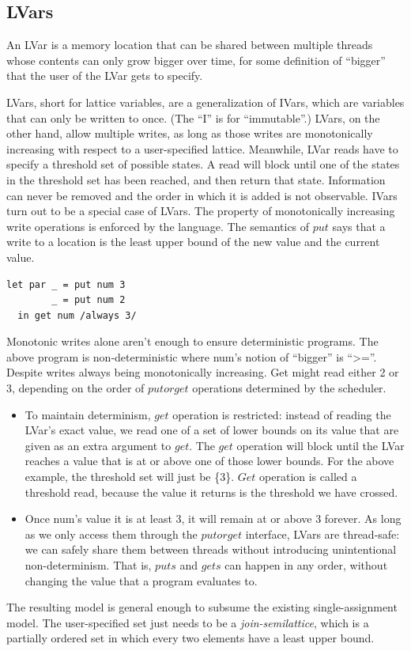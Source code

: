 \documentclass[twocolumn]{article}
\begin{document}
\subsection{LVars}
An LVar is a memory location that can be shared between multiple threads whose contents can only grow bigger over time, for some definition of “bigger” that the user of the LVar gets to specify. \par
LVars, short for lattice variables, are a generalization of IVars, which are variables that can only be written to once. (The “I” is for “immutable”.) LVars, on the other hand, allow multiple writes, as long as those writes are monotonically increasing with respect to a user-specified lattice. Meanwhile, LVar reads have to specify a threshold set of possible states. A read will block until one of the states in the threshold set has been reached, and then return that state. Information can never be removed and the order in which it is added is not observable. IVars turn out to be a special case of LVars. 
The property of monotonically increasing write operations is enforced by the language. The semantics of $put$ says that a write to a location is the least upper bound of the new value and the current value. 
\begin{lstlisting}
let par _ = put num 3
        _ = put num 2
  in get num /always 3/
\end{lstlisting}
Monotonic writes alone aren't enough to ensure deterministic programs. The above program is non-deterministic where num's notion of “bigger” is “>=”. Despite writes always being monotonically increasing. Get might read either 2 or 3, depending on the order of $put or get$ operations determined by the scheduler. \par
\begin{itemize}
\item To maintain determinism, $get$ operation is restricted: instead of reading the LVar’s exact value, we read one of a set of lower bounds on its value that are given as an extra argument to $get$. The $get$ operation will block until the LVar reaches a value that is at or above one of those lower bounds. For the above example, the threshold set will just be \{$3$\}. $Get$ operation is called a threshold read, because the value it returns is the threshold we have crossed.
\item Once num's value it is at least 3, it will remain at or above 3 forever. As long as we only access them through the $put or get$ interface, LVars are thread-safe: we can safely share them between threads without introducing unintentional non-determinism. That is, $puts$ and $gets$ can happen in any order, without changing the value that a program evaluates to.
\end{itemize}
The resulting model is general enough to subsume the existing single-assignment model. The user-specified set just needs to be a \textit{join-semilattice}, which is a partially ordered set in which every two elements have a least upper bound. 
\end{document}
